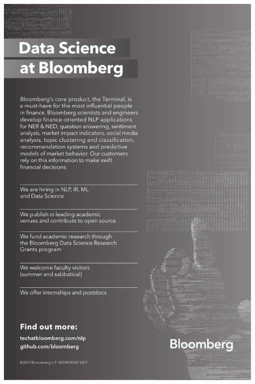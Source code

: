 \thispagestyle{empty}
\begin{center}
  \vfill
  \includegraphics[width=\textwidth]{content/ads/platinum/bloomberg.pdf}
  \vfill
\end{center}
\clearpage
